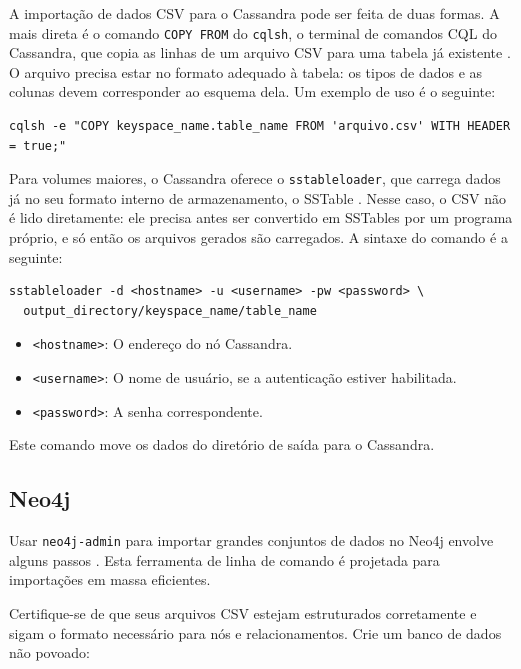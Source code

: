 A importação de dados CSV para o Cassandra pode ser feita de duas formas. A mais direta é
o comando \texttt{COPY FROM} do \texttt{cqlsh}, o terminal de comandos CQL do Cassandra,
que copia as linhas de um arquivo CSV para uma tabela já existente
\cite{cassandra_cqlsh}. O arquivo precisa estar no formato adequado à tabela: os tipos
de dados e as colunas devem corresponder ao esquema dela. Um exemplo de uso é o seguinte:

\begin{lstlisting}[style=bashstyle]
cqlsh -e "COPY keyspace_name.table_name FROM 'arquivo.csv' WITH HEADER = true;"
\end{lstlisting}

Para volumes maiores, o Cassandra oferece o \texttt{sstableloader}, que carrega dados já
no seu formato interno de armazenamento, o SSTable \cite{cassandra_sstableloader}. Nesse
caso, o CSV não é lido diretamente: ele precisa antes ser convertido em SSTables por um
programa próprio, e só então os arquivos gerados são carregados. A sintaxe do comando é a
seguinte:

\begin{lstlisting}[style=bashstyle]
sstableloader -d <hostname> -u <username> -pw <password> \
  output_directory/keyspace_name/table_name
\end{lstlisting}

\begin{itemize}
  \item \texttt{<hostname>}: O endereço do nó Cassandra.
  \item \texttt{<username>}: O nome de usuário, se a autenticação estiver habilitada.
  \item \texttt{<password>}: A senha correspondente.
\end{itemize}

Este comando move os dados do diretório de saída para o Cassandra.

\subsection{Neo4j}

Usar \texttt{neo4j-admin} para importar grandes conjuntos de dados no Neo4j envolve alguns
passos \cite{neo4j_import}. Esta ferramenta de linha de comando é projetada para importações em massa
eficientes.

Certifique-se de que seus arquivos CSV estejam estruturados corretamente e sigam o formato
necessário para nós e relacionamentos. Crie um banco de dados não povoado:

